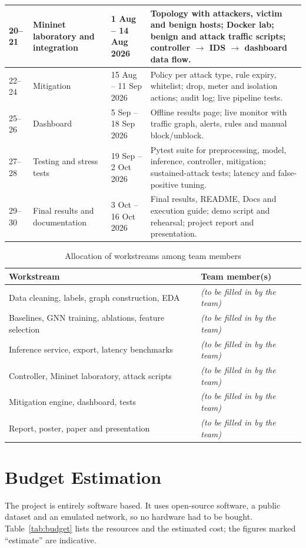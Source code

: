 \begin{appendices}
\begin{longtable}{|p{1.0cm}|p{3.4cm}|p{3.0cm}|p{7.2cm}|}
20--21 & Mininet laboratory and integration & 1 Aug -- 14 Aug 2026 & Topology with attackers, victim and benign hosts; Docker lab; benign and attack traffic scripts; controller $\to$ IDS $\to$ dashboard data flow. \\ \hline
22--24 & Mitigation & 15 Aug -- 11 Sep 2026 & Policy per attack type, rule expiry, whitelist; drop, meter and isolation actions; audit log; live pipeline tests. \\ \hline
25--26 & Dashboard & 5 Sep -- 18 Sep 2026 & Offline results page; live monitor with traffic graph, alerts, rules and manual block/unblock. \\ \hline
27--28 & Testing and stress tests & 19 Sep -- 2 Oct 2026 & Pytest suite for preprocessing, model, inference, controller, mitigation; sustained-attack tests; latency and false-positive tuning. \\ \hline
29--30 & Final results and documentation & 3 Oct -- 16 Oct 2026 & Final results, README, Docs and execution guide; demo script and rehearsal; project report and presentation. \\ \hline
\end{longtable}

\begin{table}[htbp]
\centering
\caption{Allocation of workstreams among team members}
\label{tab:alloc}
\small
\begin{tabularx}{\textwidth}{|p{5.5cm}|X|}
\hline
\textbf{Workstream} & \textbf{Team member(s)} \\ \hline
Data cleaning, labels, graph construction, EDA & \textit{(to be filled in by the team)} \\ \hline
Baselines, GNN training, ablations, feature selection & \textit{(to be filled in by the team)} \\ \hline
Inference service, export, latency benchmarks & \textit{(to be filled in by the team)} \\ \hline
Controller, Mininet laboratory, attack scripts & \textit{(to be filled in by the team)} \\ \hline
Mitigation engine, dashboard, tests & \textit{(to be filled in by the team)} \\ \hline
Report, poster, paper and presentation & \textit{(to be filled in by the team)} \\ \hline
\end{tabularx}
\end{table}

\section{Budget Estimation}
The project is entirely software based. It uses open-source software, a public dataset and an emulated network, so no hardware had to be bought. Table~\ref{tab:budget} lists the resources and the estimated cost; the figures marked ``estimate'' are indicative.


\end{appendices}
